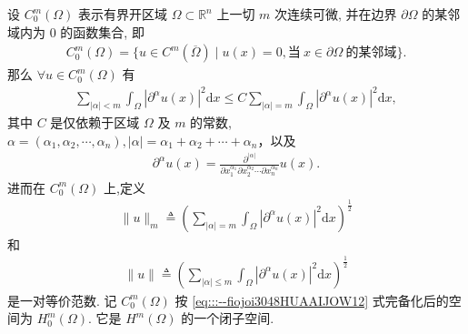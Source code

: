 \documentclass[../../main.tex]{subfiles}%
\begin{document}
\begin{lemma}[Poincaré不等式]\label{lemma:(庞加莱)Poincaré不等式}
设 $C_0^m(\Omega)$ 表示有界开区域 $\Omega\subset\mathbb{R}^n$ 上一切 $m$ 次连续可微, 并在边界 $\partial\Omega$ 的某邻域内为 $0$ 的函数集合, 即
\begin{align*}
C_0^m(\Omega)=\{u\in C^m(\overline{\Omega})\mid u(x)=0,\text{当}\ x\in\partial\Omega\ \text{的某邻域}\}.
\end{align*}
那么 $\forall u\in C_0^m(\Omega)$ 有
\begin{align}
\sum\limits_{|\alpha|<m}\int_\Omega |\partial^\alpha u(x)|^2\mathrm{d}x\leqslant C\sum\limits_{|\alpha|=m}\int_\Omega |\partial^\alpha u(x)|^2\mathrm{d}x,\label{eq:::--fiojoi3048HUAAIJOW9}
\end{align}
其中 $C$ 是仅依赖于区域 $\Omega$ 及 $m$ 的常数,$\alpha = (\alpha_1,\alpha_2,\cdots,\alpha_n), |\alpha| = \alpha_1+\alpha_2+\cdots+\alpha_n$，以及
\begin{align*}
\partial^\alpha u(x) = \frac{\partial^{|\alpha|}}{\partial x_1^{\alpha_1} \partial x_2^{\alpha_2} \cdots \partial x_n^{\alpha_n}} u(x).
\end{align*}
进而在 $C_0^m(\Omega)$ 上,定义
\begin{align}
\|u\|_m\triangleq\left(\sum\limits_{|\alpha|=m}\int_\Omega |\partial^\alpha u(x)|^2\mathrm{d}x\right)^\frac{1}{2}\label{eq:::--fiojoi3048HUAAIJOW12}
\end{align}
和
\begin{align*}
\|u\|\triangleq\left(\sum\limits_{|\alpha|\leqslant m}\int_\Omega |\partial^\alpha u(x)|^2\mathrm{d}x\right)^\frac{1}{2}
\end{align*}
是一对等价范数. 记 $C_0^m(\Omega)$ 按 \eqref{eq:::--fiojoi3048HUAAIJOW12} 式完备化后的空间为 $H_0^m(\Omega)$. 它是 $H^m(\Omega)$ 的一个闭子空间.
\end{lemma}
\end{document}
